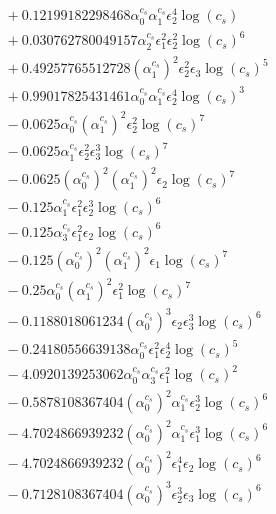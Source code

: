 \documentclass[10pt]{article}
\begin{document}
\begin{align*}
&{}  + 0.12199182298468 \alpha_{0}^{c_s} \alpha_{1}^{c_s} \epsilon_{2}^{4} \log{\left(c_{s} \right)} \\
&{}  + 0.030762780049157 \alpha_{2}^{c_s} \epsilon_{1}^{2} \epsilon_{2}^{2} \log{\left(c_{s} \right)}^{6} \\
&{}  + 0.49257765512728 \left(\alpha_{1}^{c_s}\right)^{2} \epsilon_{2}^{2} \epsilon_{3} \log{\left(c_{s} \right)}^{5} \\
&{}  + 0.99017825431461 \alpha_{0}^{c_s} \alpha_{1}^{c_s} \epsilon_{2}^{4} \log{\left(c_{s} \right)}^{3} \\
&{}  - 0.0625 \alpha_{0}^{c_s} \left(\alpha_{1}^{c_s}\right)^{2} \epsilon_{2}^{2} \log{\left(c_{s} \right)}^{7} \\
&{}  - 0.0625 \alpha_{1}^{c_s} \epsilon_{2}^{2} \epsilon_{3}^{3} \log{\left(c_{s} \right)}^{7} \\
&{}  - 0.0625 \left(\alpha_{0}^{c_s}\right)^{2} \left(\alpha_{1}^{c_s}\right)^{2} \epsilon_{2} \log{\left(c_{s} \right)}^{7} \\
&{}  - 0.125 \alpha_{1}^{c_s} \epsilon_{1}^{2} \epsilon_{2}^{3} \log{\left(c_{s} \right)}^{6} \\
&{}  - 0.125 \alpha_{3}^{c_s} \epsilon_{1}^{2} \epsilon_{2} \log{\left(c_{s} \right)}^{6} \\
&{}  - 0.125 \left(\alpha_{0}^{c_s}\right)^{2} \left(\alpha_{1}^{c_s}\right)^{2} \epsilon_{1} \log{\left(c_{s} \right)}^{7} \\
&{}  - 0.25 \alpha_{0}^{c_s} \left(\alpha_{1}^{c_s}\right)^{2} \epsilon_{1}^{2} \log{\left(c_{s} \right)}^{7} \\
&{}  - 0.1188018061234 \left(\alpha_{0}^{c_s}\right)^{3} \epsilon_{2} \epsilon_{3}^{3} \log{\left(c_{s} \right)}^{6} \\
&{}  - 0.24180556639138 \alpha_{0}^{c_s} \epsilon_{1}^{2} \epsilon_{2}^{4} \log{\left(c_{s} \right)}^{5} \\
&{}  - 4.0920139253062 \alpha_{0}^{c_s} \alpha_{3}^{c_s} \epsilon_{1}^{2} \log{\left(c_{s} \right)}^{2} \\
&{}  - 0.5878108367404 \left(\alpha_{0}^{c_s}\right)^{2} \alpha_{1}^{c_s} \epsilon_{2}^{3} \log{\left(c_{s} \right)}^{6} \\
&{}  - 4.7024866939232 \left(\alpha_{0}^{c_s}\right)^{2} \alpha_{1}^{c_s} \epsilon_{1}^{3} \log{\left(c_{s} \right)}^{6} \\
&{}  - 4.7024866939232 \left(\alpha_{0}^{c_s}\right)^{2} \epsilon_{1}^{4} \epsilon_{2} \log{\left(c_{s} \right)}^{6} \\
&{}  - 0.7128108367404 \left(\alpha_{0}^{c_s}\right)^{3} \epsilon_{2}^{3} \epsilon_{3} \log{\left(c_{s} \right)}^{6} \\

\end{align*}
\end{document}

